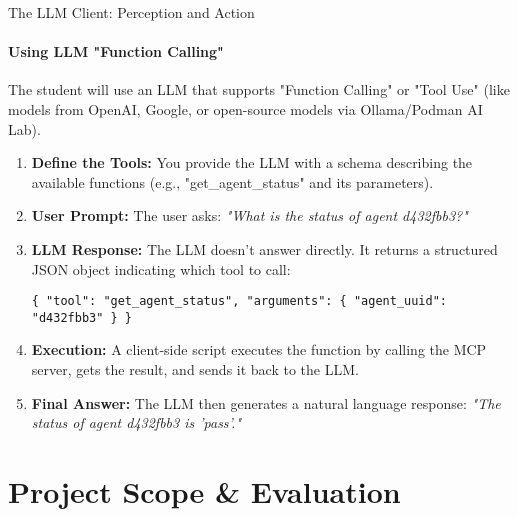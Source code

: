 \documentclass{beamer}
\begin{document}
\begin{frame}{The LLM Client: Perception and Action}
    \framesubtitle{Using LLM "Function Calling"}

    The student will use an LLM that supports "Function Calling" or "Tool Use" (like models from OpenAI, Google, or open-source models via Ollama/Podman AI Lab).

    \begin{enumerate}
        \item \textbf{Define the Tools:} You provide the LLM with a schema describing the available functions (e.g., "get\_agent\_status" and its parameters).
        \vspace{1em}
        \item \textbf{User Prompt:} The user asks: \textit{"What is the status of agent d432fbb3?"}
        \vspace{1em}
        \item \textbf{LLM Response:} The LLM doesn't answer directly. It returns a structured JSON object indicating which tool to call:
        \begin{center}
        \texttt{\{ "tool": "get\_agent\_status", "arguments": \{ "agent\_uuid": "d432fbb3" \} \}}
        \end{center}
        \vspace{1em}
        \item \textbf{Execution:} A client-side script executes the function by calling the MCP server, gets the result, and sends it back to the LLM.
        \vspace{1em}
        \item \textbf{Final Answer:} The LLM then generates a natural language response: \textit{"The status of agent d432fbb3 is 'pass'."}
    \end{enumerate}
\end{frame}

\section{Project Scope \& Evaluation}
\end{document}
